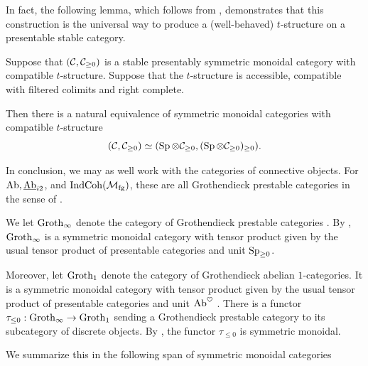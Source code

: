 In fact, the following lemma, which follows from \cite[Remark C.3.1.5]{SAG}, demonstrates that this construction is the universal way to produce a (well-behaved) $t$-structure on a presentable stable category. 

\begin{lem} \label{lem:conn-enough}
  Suppose that $(\mathcal{C}, \mathcal{C}_{\geq 0})$ is a stable presentably symmetric monoidal category with compatible $t$-structure. Suppose that the $t$-structure is accessible, compatible with filtered colimits and right complete.

  Then there is a natural equivalence of symmetric monoidal categories with compatible $t$-structure
  \[(\mathcal{C}, \mathcal{C}_{\geq 0}) \simeq (\operatorname{\mathrm{Sp}} \otimes \mathcal{C}_{\geq 0}, (\operatorname{\mathrm{Sp}} \otimes \mathcal{C}_{\geq 0})_{\geq 0}).\]
\end{lem}


In conclusion, we may as well work with the categories of connective objects. For $\mathrm{Ab}, \underline{\mathrm{Ab}}_{i2}$, and $\mathrm{IndCoh}(\mathcal{M}_{\mathrm{fg}})$, these are all Grothendieck prestable categories in the sense of \cite[Definition C.1.4.2]{SAG}.

\begin{rec} \label{rec:groth-ab}
  We let $\mathrm{Groth}_{\infty}$ denote the category of Grothendieck prestable categories \cite[Definition C.3.0.5]{SAG}. By \cite[Theorem C.4.2.1]{SAG}, $\mathrm{Groth}_{\infty}$ is a symmetric monoidal category with tensor product given by the usual tensor product of presentable categories and unit $\operatorname{\mathrm{Sp}}_{\geq 0}$.

  Moreover, let $\mathrm{Groth}_{1}$ denote the category of Grothendieck abelian $1$-categories. It is a symmetric monoidal category with tensor product given by the usual tensor product of presentable categories and unit $\mathrm{Ab}^{\heartsuit}$ \cite[Corollary C.5.4.19]{SAG}. There is a functor $\tau_{\leq 0} : \mathrm{Groth}_{\infty} \to \mathrm{Groth}_{1}$ sending a Grothendieck prestable category to its subcategory of discrete objects.
  By \cite[Remark C.5.4.20]{SAG}, the functor $\tau_{\leq 0}$ is symmetric monoidal.

  We summarize this in the following span of symmetric monoidal categories 
  \begin{center}
  \end{center}
\end{rec}

